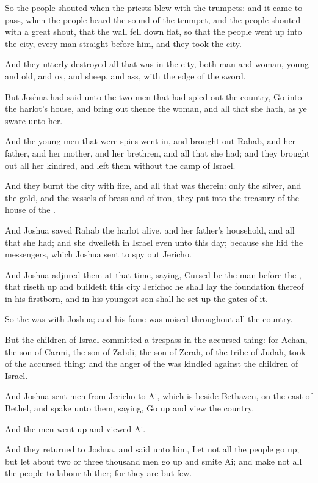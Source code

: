 \Verse So the people shouted when the priests blew with the trumpets: and it came to pass, when the people heard the sound of the trumpet, and the people shouted with a great shout, that the wall fell down flat, so that the people went up into the city, every man straight before him, and they took the city.

\Verse And they utterly destroyed all that was in the city, both man and woman, young and old, and ox, and sheep, and ass, with the edge of the sword.

\Verse But Joshua had said unto the two men that had spied out the country, Go into the harlot's house, and bring out thence the woman, and all that she hath, as ye sware unto her.

\Verse And the young men that were spies went in, and brought out Rahab, and her father, and her mother, and her brethren, and all that she had; and they brought out all her kindred, and left them without the camp of Israel.

\Verse And they burnt the city with fire, and all that was therein: only the silver, and the gold, and the vessels of brass and of iron, they put into the treasury of the house of the \LORD.

\Verse And Joshua saved Rahab the harlot alive, and her father's household, and all that she had; and she dwelleth in Israel even unto this day; because she hid the messengers, which Joshua sent to spy out Jericho.

\Verse And Joshua adjured them at that time, saying, Cursed be the man before the \LORD, that riseth up and buildeth this city Jericho: he shall lay the foundation thereof in his firstborn, and in his youngest son shall he set up the gates of it.

\Verse So the \LORD was with Joshua; and his fame was noised throughout all the country.


\Chapter
\Verse But the children of Israel committed a trespass in the accursed thing: for Achan, the son of Carmi, the son of Zabdi, the son of Zerah, of the tribe of Judah, took of the accursed thing: and the anger of the \LORD was kindled against the children of Israel.

\Verse And Joshua sent men from Jericho to Ai, which is beside Bethaven, on the east of Bethel, and spake unto them, saying, Go up and view the country.

And the men went up and viewed Ai.

\Verse And they returned to Joshua, and said unto him, Let not all the people go up; but let about two or three thousand men go up and smite Ai; and make not all the people to labour thither; for they are but few.

